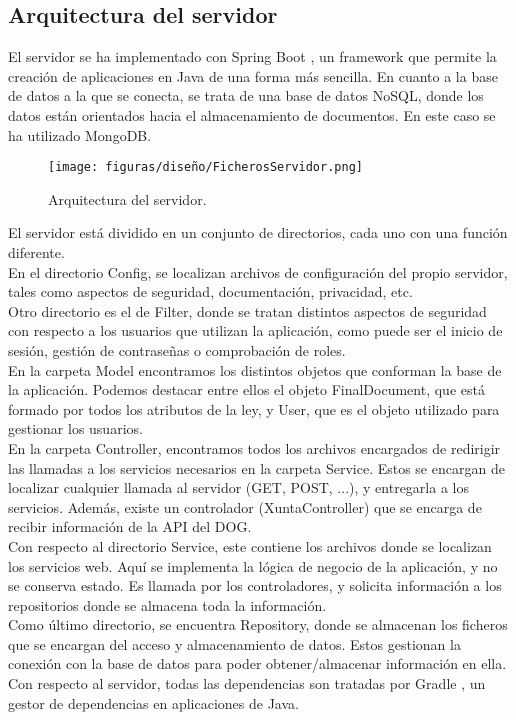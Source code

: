 \subsection{Arquitectura  del servidor}

El servidor se ha implementado con Spring Boot \cite{spring}, un framework que permite la creación de aplicaciones en Java de una forma más sencilla. En cuanto a la base de datos a la que se conecta, se trata de una base de datos NoSQL, donde los datos están orientados hacia el almacenamiento de documentos. En este caso se ha utilizado MongoDB.

\begin{figure}[H]
\centerline{\texttt{[image: figuras/diseño/FicherosServidor.png]}}
\caption{Arquitectura del servidor.}
\label{enlaceArquitecturaServidor}
\end{figure}

El servidor está dividido en un conjunto de directorios, cada uno con una función diferente. 
\\

En el directorio Config, se localizan archivos de configuración del propio servidor, tales como aspectos de seguridad, documentación, privacidad, etc. 
\\

Otro directorio es el de Filter, donde se tratan distintos aspectos de seguridad con respecto a los usuarios que utilizan la aplicación, como puede ser el inicio de sesión, gestión de contraseñas o comprobación de roles.
\\

En la carpeta Model encontramos los distintos objetos que conforman la base de la aplicación. Podemos destacar entre ellos el objeto FinalDocument, que está formado por todos los atributos de la ley, y User, que es el objeto utilizado para gestionar los usuarios.
\\

En la carpeta Controller, encontramos todos los archivos encargados de redirigir las llamadas a los servicios necesarios en la carpeta Service. Estos se encargan de localizar cualquier llamada al servidor (GET, POST, ...), y entregarla a los servicios. Además, existe un controlador (XuntaController) que se encarga de recibir información de la API del DOG.
\\

Con respecto al directorio Service, este contiene los archivos donde se localizan los servicios web. Aquí se implementa la lógica de negocio de la aplicación, y no se conserva estado. Es llamada por los controladores, y solicita información a los repositorios donde se almacena toda la información.
\\

Como último directorio, se encuentra Repository, donde se almacenan los ficheros que se encargan del acceso y almacenamiento de datos. Estos gestionan la conexión con la base de datos para poder obtener/almacenar información en ella.
\\

Con respecto al servidor, todas las dependencias son tratadas por Gradle \cite{gradle}, un gestor de dependencias en aplicaciones de Java.